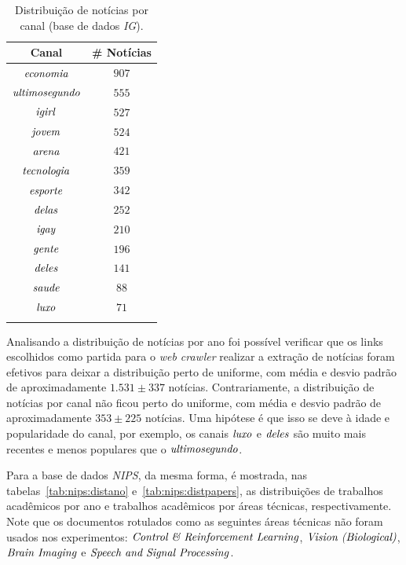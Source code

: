 \documentclass[
    12pt,                %
    oneside,            %
    a4paper,            %
    english,            %
    brazil                %
    ]{abntex2ppgsi}
\begin{document}
\begin{table}[h]
\centering
\caption{Distribuição de notícias por canal (base de dados \textit{IG}).}
    \begin{tabular}{cc}
        \hline
        Canal & \# Notícias \\
        \hline
        $\text{\textit{economia}}$      & $907$ \\
        $\text{\textit{ultimosegundo}}$ & $555$ \\
        $\text{\textit{igirl}}$         & $527$ \\
        $\text{\textit{jovem}}$         & $524$ \\
        $\text{\textit{arena}}$         & $421$ \\
        $\text{\textit{tecnologia}}$    & $359$ \\
        $\text{\textit{esporte}}$       & $342$ \\
        $\text{\textit{delas}}$         & $252$ \\
        $\text{\textit{igay}}$          & $210$ \\
        $\text{\textit{gente}}$         & $196$ \\
        $\text{\textit{deles}}$         & $141$ \\
        $\text{\textit{saude}}$         & $88$  \\
        $\text{\textit{luxo}}$          & $71$  \\
        \hline
        & \\
    \end{tabular}
    \label{tab:ig:distcanal}
\end{table}

Analisando a distribuição de notícias por ano foi possível verificar que os links escolhidos como partida para o \textit{web crawler} realizar a extração de notícias foram efetivos para deixar a distribuição perto de uniforme, com média e desvio padrão de aproximadamente $1.531 \pm 337$ notícias.
Contrariamente, a distribuição de notícias por canal não ficou perto do uniforme, com média e desvio padrão de aproximadamente $353 \pm 225$ notícias.
Uma hipótese é que isso se deve à idade e popularidade do canal, por exemplo, os canais $\text{\textit{luxo}}$ e $\text{\textit{deles}}$ são muito mais recentes e menos populares que o $\text{\textit{ultimosegundo}}$.

Para a base de dados \textit{NIPS}, da mesma forma, é mostrada, nas tabelas~\ref{tab:nips:distano} e~\ref{tab:nips:distpapers}, as distribuições de trabalhos acadêmicos por ano e trabalhos acadêmicos por áreas técnicas, respectivamente.
Note que os documentos rotulados como as seguintes áreas técnicas não foram usados nos experimentos: $\text{\textit{Control \& Reinforcement Learning}}$, $\text{\textit{Vision (Biological)}}$, $\text{\textit{Brain Imaging}}$ e $\text{\textit{Speech and Signal Processing}}$.
\end{document}
